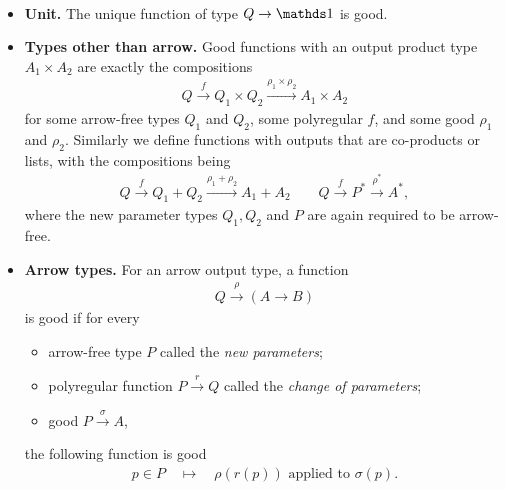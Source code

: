 \begin{definition}
    \label{def:good-function}\ 
    \begin{itemize}
        \item \textbf{Unit.} The unique function of type $Q \to \onetype$ is good.
        
        \item \textbf{Types other than arrow.} Good functions with an output product type $A_1 \times A_2$ are exactly the compositions 
        \begin{align*}
        Q \xrightarrow f Q_1 \times Q_2 \xrightarrow {\rho_1 \times \rho_2} A_1 \times A_2
        \end{align*}
        for some arrow-free types $Q_1$ and $Q_2$, some polyregular $f$, and some good $\rho_1$ and $\rho_2$. Similarly we define functions with outputs that are co-products or lists, with the compositions being 
                \begin{align*}
        Q \xrightarrow f Q_1+Q_2 \xrightarrow {\rho_1 + \rho_2} A_1 + A_2 \qquad 
        Q \xrightarrow f  P^* \xrightarrow {\rho^*} A^*,
        \end{align*}
        where the new parameter types $Q_1,Q_2$ and $P$ are again required to be arrow-free.
        \item \textbf{Arrow types.} For an arrow output type, a function 
        \begin{align*}
        Q \xrightarrow \rho (A \to B)
        \end{align*}
        is  good if for every 
        \begin{itemize}
            \item arrow-free type $P$ called the \emph{new parameters};
            \item polyregular function $P \xrightarrow r Q$ called the \emph{change of parameters};
            \item good $P \xrightarrow \sigma A$,
        \end{itemize}
        the following function is good
        \begin{align*}
            p \in P \quad \mapsto \quad  \rho(r(p)) \text{ applied to } \sigma(p).
        \end{align*}
    \end{itemize}
\end{definition}

